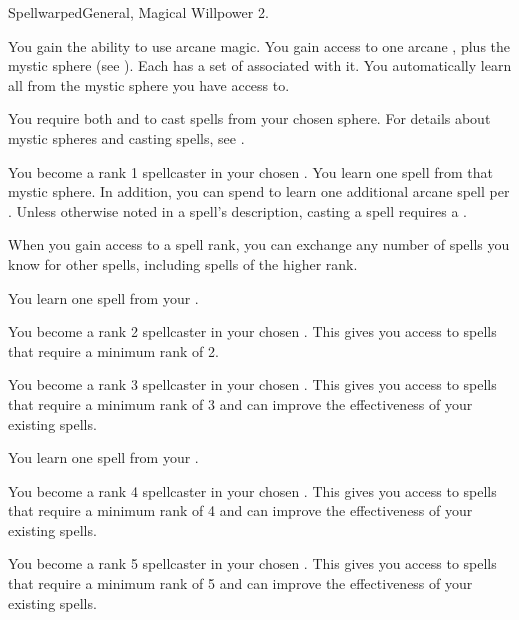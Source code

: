     \begin{magicalfeat}{Spellwarped}{General, Magical}
        \featpre Willpower 2.

         You gain the ability to use arcane magic.
        You gain access to one arcane , plus the  mystic sphere (see ).
        Each  has a set of  associated with it.
        You automatically learn all  from the mystic sphere you have access to.

        You require both  and  to cast spells from your chosen sphere.
        For details about mystic spheres and casting spells, see .

         You become a rank 1 spellcaster in your chosen .
        You learn one spell from that mystic sphere.
        In addition, you can spend  to learn one additional arcane spell per .
        Unless otherwise noted in a spell's description, casting a spell requires a .

        When you gain access to a spell rank,
            you can exchange any number of spells you know for other spells,
            including spells of the higher rank.

         You learn one spell from your .

         You become a rank 2 spellcaster in your chosen .
        This gives you access to spells that require a minimum rank of 2.

         You become a rank 3 spellcaster in your chosen .
        This gives you access to spells that require a minimum rank of 3 and can improve the effectiveness of your existing spells.

         You learn one spell from your .

         You become a rank 4 spellcaster in your chosen .
        This gives you access to spells that require a minimum rank of 4 and can improve the effectiveness of your existing spells.

         You become a rank 5 spellcaster in your chosen .
        This gives you access to spells that require a minimum rank of 5 and can improve the effectiveness of your existing spells.


\end{magicalfeat}
